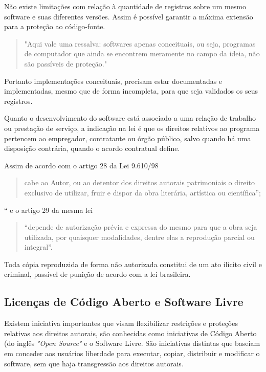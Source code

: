 Não existe limitações com relação à quantidade de registros sobre um mesmo software e suas diferentes versões. Assim é possível garantir a máxima extensão para a proteção ao código-fonte. \citep{inpiPerguntasFrequentes} 

\begin{quote}
    "Aqui vale uma ressalva: softwares apenas conceituais, ou seja, programas de computador que ainda se encontrem meramente no campo da ideia, não são passíveis de proteção." \citep{inpiPerguntasFrequentes}
\end{quote}

Portanto implementações conceituais, precisam estar documentadas e implementadas, mesmo que de forma incompleta, para que seja validados os seus registros. 

Quanto o desenvolvimento do software está associado a uma relação de trabalho ou prestação de serviço, a indicação na lei é que os direitos relativos ao programa pertencem ao empregador, contratante ou órgão público, salvo quando há uma disposição contrária, quando o acordo contratual define. \citep{lei9609/98}

Assim de acordo com o artigo 28 da Lei 9.610/98 
\begin{quote}
    cabe ao Autor, ou ao detentor dos direitos autorais patrimoniais o direito exclusivo de utilizar, fruir e dispor da obra literária, artística ou científica”; \citep{lei9610/98}
\end{quote}“ 
e o artigo 29 da mesma lei
\begin{quote}
    “depende de autorização prévia e expressa do mesmo para que a obra seja utilizada, por quaisquer modalidades, dentre elas a reprodução parcial ou integral”. \citep{lei9610/98}
\end{quote}
Toda cópia reproduzida de forma não autorizada constitui de um ato ilícito civil e criminal, passível de punição de acordo com a lei brasileira.

\subsection{Licenças de Código Aberto  e Software Livre}

Existem iniciativa importantes que visam flexibilizar restrições e proteções relativas aos direitos autorais, são conhecidas como iniciativas de Código Aberto (do inglês \textit{"Open Source"} e o Software Livre. São iniciativas distintas que baseiam em conceder aos usuários liberdade para executar, copiar, distribuir e modificar o software, sem que haja transgressão aos direitos autorais.


